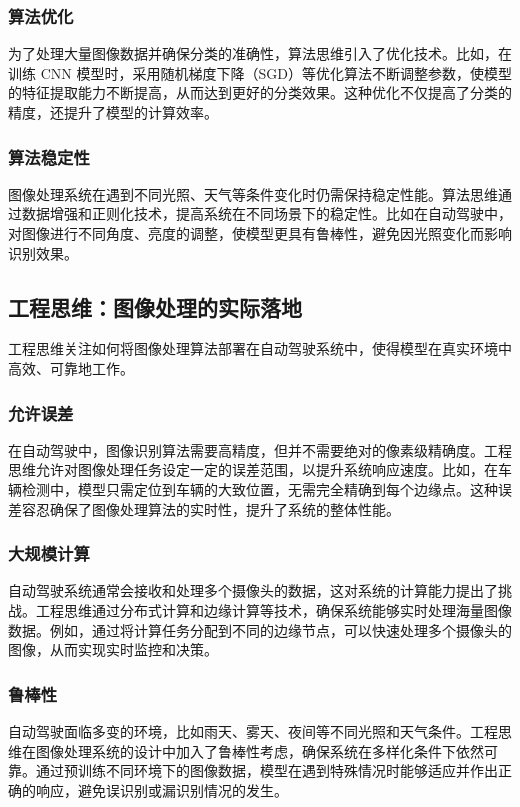 \subsubsection*{算法优化}
为了处理大量图像数据并确保分类的准确性，算法思维引入了优化技术。比如，在训练 CNN 模型时，采用随机梯度下降（SGD）等优化算法不断调整参数，使模型的特征提取能力不断提高，从而达到更好的分类效果。这种优化不仅提高了分类的精度，还提升了模型的计算效率。

\subsubsection*{算法稳定性}
图像处理系统在遇到不同光照、天气等条件变化时仍需保持稳定性能。算法思维通过数据增强和正则化技术，提高系统在不同场景下的稳定性。比如在自动驾驶中，对图像进行不同角度、亮度的调整，使模型更具有鲁棒性，避免因光照变化而影响识别效果。

\subsection{ 工程思维：图像处理的实际落地}

工程思维关注如何将图像处理算法部署在自动驾驶系统中，使得模型在真实环境中高效、可靠地工作。

\subsubsection*{允许误差}在自动驾驶中，图像识别算法需要高精度，但并不需要绝对的像素级精确度。工程思维允许对图像处理任务设定一定的误差范围，以提升系统响应速度。比如，在车辆检测中，模型只需定位到车辆的大致位置，无需完全精确到每个边缘点。这种误差容忍确保了图像处理算法的实时性，提升了系统的整体性能。

\subsubsection*{大规模计算}
自动驾驶系统通常会接收和处理多个摄像头的数据，这对系统的计算能力提出了挑战。工程思维通过分布式计算和边缘计算等技术，确保系统能够实时处理海量图像数据。例如，通过将计算任务分配到不同的边缘节点，可以快速处理多个摄像头的图像，从而实现实时监控和决策。

\subsubsection*{鲁棒性}
自动驾驶面临多变的环境，比如雨天、雾天、夜间等不同光照和天气条件。工程思维在图像处理系统的设计中加入了鲁棒性考虑，确保系统在多样化条件下依然可靠。通过预训练不同环境下的图像数据，模型在遇到特殊情况时能够适应并作出正确的响应，避免误识别或漏识别情况的发生。

